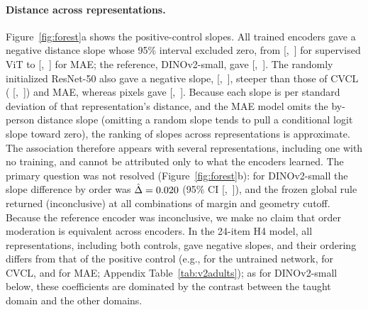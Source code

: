 \documentclass[11pt]{article}
\begin{document}
\paragraph{Distance across representations.} Figure~\ref{fig:forest}a shows the positive-control slopes. All \VtPcTrainedNeg{} trained encoders gave a negative distance slope whose 95\% interval excluded zero, from \VtPcViTB{} [\VtPcViTLo,~\VtPcViTHi] for supervised ViT to \VtPcMaeB{} [\VtPcMaeLo,~\VtPcMaeHi] for MAE; the reference, DINOv2-small, gave \VtPcRefB{} [\VtPcRefLo,~\VtPcRefHi]. The randomly initialized ResNet-50 also gave a negative slope, \VtPcRandB{} [\VtPcRandLo,~\VtPcRandHi], steeper than those of CVCL (\VbPcCvclB{} [\VbPcCvclLo,~\VbPcCvclHi]) and MAE, whereas pixels gave \VtPcPixB{} [\VtPcPixLo,~\VtPcPixHi]. Because each slope is per standard deviation of that representation's distance, and the MAE model omits the by-person distance slope (omitting a random slope tends to pull a conditional logit slope toward zero), the ranking of slopes across representations is approximate. The association therefore appears with several representations, including one with no training, and cannot be attributed only to what the encoders learned. The primary question was not resolved (Figure~\ref{fig:forest}b): for DINOv2-small the slope difference by order was $\hat\Delta = 0.020$ (95\% CI [\VtOrdLo,~\VtOrdHi]), and the frozen global rule returned \VtGlobalLabel{} (inconclusive) at all \VtGlobalCells{} combinations of margin and geometry cutoff. Because the reference encoder was inconclusive, we make no claim that order moderation is equivalent across encoders. In the 24-item H4 model, all \VbHfourAllNeg{} representations, including both controls, gave negative slopes, and their ordering differs from that of the positive control (e.g., \VbHfourRandB{} for the untrained network, \VbHfourCvclB{} for CVCL, and \VbHfourMaeB{} for MAE; Appendix Table~\ref{tab:v2adults}); as for DINOv2-small below, these coefficients are dominated by the contrast between the taught domain and the other domains.
\end{document}
